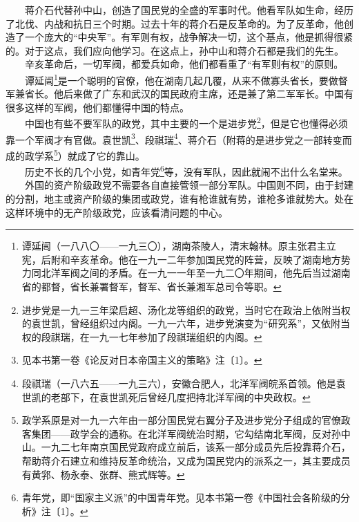 \documentclass[cn,11pt,chinese]{elegantbook}
\begin{document}
　　蒋介石代替孙中山，创造了国民党的全盛的军事时代。他看军队如生命，经历了北伐、内战和抗日三个时期。过去十年的蒋介石是反革命的。为了反革命，他创造了一个庞大的“中央军”。有军则有权，战争解决一切，这个基点，他是抓得很紧的。对于这点，我们应向他学习。在这点上，孙中山和蒋介石都是我们的先生。\\
　　辛亥革命后，一切军阀，都爱兵如命，他们都看重了“有军则有权”的原则。\\
　　谭延闿\footnote[12]{ 谭延闿（一八八〇——一九三〇），湖南茶陵人，清末翰林。原主张君主立宪，后附和辛亥革命。他在一九一二年参加国民党的阵营，反映了湖南地方势力同北洋军阀之间的矛盾。在一九一一年至一九二〇年期间，他先后当过湖南省的都督，省长兼署督军，督军、省长兼湘军总司令等职。}是一个聪明的官僚，他在湖南几起几覆，从来不做寡头省长，要做督军兼省长。他后来做了广东和武汉的国民政府主席，还是兼了第二军军长。中国有很多这样的军阀，他们都懂得中国的特点。\\
　　中国也有些不要军队的政党，其中主要的一个是进步党\footnote[13]{ 进步党是一九一三年梁启超、汤化龙等组织的政党，当时它在政治上依附当权的袁世凯，曾经组织过内阁。一九一六年，进步党演变为“研究系”，又依附当权的段祺瑞，在一九一七年参加了段祺瑞组织的内阁。}，但是它也懂得必须靠一个军阀才有官做。袁世凯\footnote[14]{ 见本书第一卷《论反对日本帝国主义的策略》注〔1〕。}、段祺瑞\footnote[15]{ 段祺瑞（一八六五——一九三六），安徽合肥人，北洋军阀皖系首领。他是袁世凯的老部下，在袁世凯死后曾经几度把持北洋军阀的中央政权。}、蒋介石（附蒋的是进步党之一部转变而成的政学系\footnote[16]{ 政学系原是对一九一六年由一部分国民党右翼分子及进步党分子组成的官僚政客集团——政学会的通称。在北洋军阀统治时期，它勾结南北军阀，反对孙中山。一九二七年南京国民党政府成立前后，该系一部分成员先后投靠蒋介石，帮助蒋介石建立和维持反革命统治，又成为国民党内的派系之一，其主要成员有黄郛、杨永泰、张群、熊式辉等。}）就成了它的靠山。\\
　　历史不长的几个小党，如青年党\footnote[17]{ 青年党，即“国家主义派”的中国青年党。见本书第一卷《中国社会各阶级的分析》注〔1〕。}等，没有军队，因此就闹不出什么名堂来。\\
　　外国的资产阶级政党不需要各自直接管领一部分军队。中国则不同，由于封建的分割，地主或资产阶级的集团或政党，谁有枪谁就有势，谁枪多谁就势大。处在这样环境中的无产阶级政党，应该看清问题的中心。\\
\end{document}
